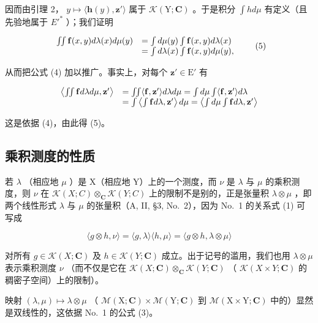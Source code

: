 因而由引理 2， \(y \mapsto \langle \mathbf{h}(y), \mathbf{z}' \rangle\) 属于 \(\mathcal{K}(\mathrm{Y}; \mathbf{C})\) 。于是积分 \(\int h d\mu\) 有定义（且先验地属于 \(E'^{*}\) ）；我们证明

\[
\begin{array}{r l} \iint \mathbf {f} (x, y) d \lambda (x) d \mu (y) & = \int d \mu (y) \int \mathbf {f} (x, y) d \lambda (x) \\ & = \int d \lambda (x) \int \mathbf {f} (x, y) d \mu (y), \end{array}\tag{5}
\]

从而把公式 (4) 加以推广。事实上，对每个 \(\mathbf{z}' \in \mathrm{E}'\) 有

\[
\begin{array}{r l} \left\langle \iint \mathbf {f} d \lambda d \mu , \mathbf {z} ^ {\prime} \right\rangle & = \iint \langle \mathbf {f}, \mathbf {z} ^ {\prime} \rangle d \lambda d \mu = \int d \mu \int \langle \mathbf {f}, \mathbf {z} ^ {\prime} \rangle d \lambda \\ & = \int \left\langle \int \mathbf {f} d \lambda , \mathbf {z} ^ {\prime} \right\rangle d \mu = \left\langle \int d \mu \int \mathbf {f} d \lambda , \mathbf {z} ^ {\prime} \right\rangle \end{array}
\]

这是依据 (4)，由此得 (5)。

\subsection{乘积测度的性质}

若 \(\lambda\) （相应地 \(\mu\) ）是 X（相应地 Y）上的一个测度，而 \(\nu\) 是 \(\lambda\) 与 \(\mu\) 的乘积测度，则 \(\nu\) 在 \(\mathcal{K}(X;C)\otimes_{\mathbf{C}}\mathcal{K}(Y;C)\) 上的限制不是别的，正是张量积 \(\lambda\otimes\mu\) ，即两个线性形式 \(\lambda\) 与 \(\mu\) 的张量积（A, II, §3, No.~2），因为 No.~1 的关系式 (1) 可写成

\[
\langle g \otimes h, \nu \rangle = \langle g, \lambda \rangle \langle h, \mu \rangle = \langle g \otimes h, \lambda \otimes \mu \rangle
\]

对所有 \(g \in \mathcal{K}(X; \mathbf{C})\) 及 \(h \in \mathcal{K}(Y; \mathbf{C})\) 成立。出于记号的滥用，我们也用 \(\lambda \otimes \mu\) 表示乘积测度 \(\nu\) （而不仅是它在 \(\mathcal{K}(X; \mathbf{C}) \otimes_{\mathbf{C}} \mathcal{K}(Y; \mathbf{C})\) （ \(\mathcal{K}(X \times Y; \mathbf{C})\) 的稠密子空间）上的限制）。

映射 \((\lambda, \mu) \mapsto \lambda \otimes \mu\) （ \(\mathcal{M}(\mathrm{X}; \mathbf{C}) \times \mathcal{M}(\mathrm{Y}; \mathbf{C})\) 到 \(\mathcal{M}(\mathrm{X} \times \mathrm{Y}; \mathbf{C})\) 中的）显然是双线性的，这依据 No.~1 的公式 (3)。

